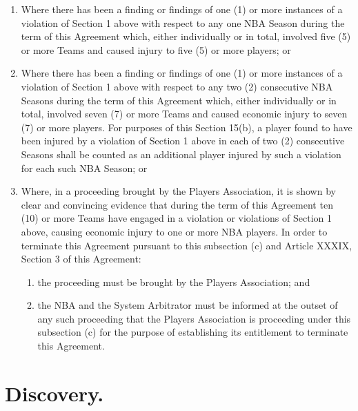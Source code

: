 \documentclass[
]{book}
\providecommand{\tightlist}{%
  \setlength{\itemsep}{0pt}\setlength{\parskip}{0pt}}
\begin{document}
\begin{enumerate}
\def\labelenumi{(\alph{enumi})}
\tightlist
\item
  Where there has been a finding or findings of one (1) or more instances of a violation of Section 1 above with respect to any one NBA Season during the term of this Agreement which, either individually or in total, involved five (5) or more Teams and caused injury to five (5) or more players; or
\item
  Where there has been a finding or findings of one (1) or more instances of a violation of Section 1 above with respect to any two (2) consecutive NBA Seasons during the term of this Agreement which, either individually or in total, involved seven (7) or more Teams and caused economic injury to seven (7) or more players. For purposes of this Section 15(b), a player found to have been injured by a violation of Section 1 above in each of two (2) consecutive Seasons shall be counted as an additional player injured by such a violation for each such NBA Season; or
\item
  Where, in a proceeding brought by the Players Association, it is shown by clear and convincing evidence that during the term of this Agreement ten (10) or more Teams have engaged in a violation or violations of Section 1 above, causing economic injury to one or more NBA players. In order to terminate this Agreement pursuant to this subsection (c) and Article XXXIX, Section 3 of this Agreement:

  \begin{enumerate}
  \def\labelenumii{(\roman{enumii})}
  \tightlist
  \item
    the proceeding must be brought by the Players Association; and
  \item
    the NBA and the System Arbitrator must be informed at the outset of any such proceeding that the Players Association is proceeding under this subsection (c) for the purpose of establishing its entitlement to terminate this Agreement.
  \end{enumerate}
\end{enumerate}

\hypertarget{discovery.}{%
\section{Discovery.}\label{discovery.}}
\end{document}
